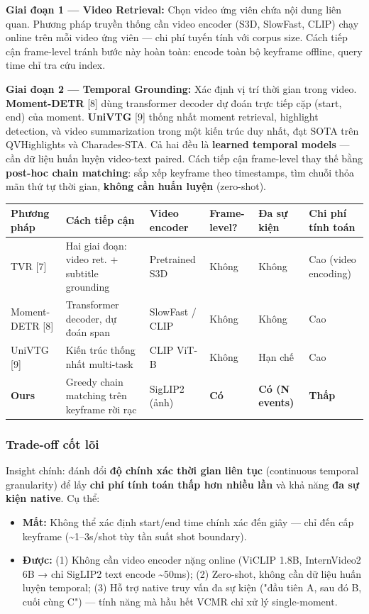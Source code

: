 \documentclass[12pt,a4paper,onecolumn]{article}
\begin{document}
\textbf{Giai đoạn 1 — Video Retrieval:} Chọn video ứng viên chứa nội dung liên quan. Phương pháp truyền thống cần video encoder (S3D, SlowFast, CLIP) chạy online trên mỗi video ứng viên — chi phí tuyến tính với corpus size. Cách tiếp cận frame-level tránh bước này hoàn toàn: encode toàn bộ keyframe offline, query time chỉ tra cứu index.

\textbf{Giai đoạn 2 — Temporal Grounding:} Xác định vị trí thời gian trong video. \textbf{Moment-DETR} [8] dùng transformer decoder dự đoán trực tiếp cặp (start, end) của moment. \textbf{UniVTG} [9] thống nhất moment retrieval, highlight detection, và video summarization trong một kiến trúc duy nhất, đạt SOTA trên QVHighlights và Charades-STA. Cả hai đều là \textbf{learned temporal models} — cần dữ liệu huấn luyện video-text paired. Cách tiếp cận frame-level thay thế bằng \textbf{post-hoc chain matching}: sắp xếp keyframe theo timestamps, tìm chuỗi thỏa mãn thứ tự thời gian, \textbf{không cần huấn luyện} (zero-shot).

\noindent
{\small
\begin{tabularx}{\textwidth}{l Y l l l l}
\toprule
Phương pháp & Cách tiếp cận & Video encoder & Frame-level? & Đa sự kiện & Chi phí tính toán \\
\midrule
TVR [7] & Hai giai đoạn: video ret. + subtitle grounding & Pretrained S3D & Không & Không & Cao (video encoding) \\
Moment-DETR [8] & Transformer decoder, dự đoán span & SlowFast / CLIP & Không & Không & Cao \\
UniVTG [9] & Kiến trúc thống nhất multi-task & CLIP ViT-B & Không & Hạn chế & Cao \\
\textbf{Ours} & Greedy chain matching trên keyframe rời rạc & SigLIP2 (ảnh) & \textbf{Có} & \textbf{Có (N events)} & \textbf{Thấp} \\
\bottomrule
\end{tabularx}
}


\subsubsection{Trade-off cốt lõi}

Insight chính: đánh đổi \textbf{độ chính xác thời gian liên tục} (continuous temporal granularity) để lấy \textbf{chi phí tính toán thấp hơn nhiều lần} và khả năng \textbf{đa sự kiện native}. Cụ thể:

\begin{itemize}
  \item \textbf{Mất:} Không thể xác định start/end time chính xác đến giây — chỉ đến cấp keyframe (\textasciitilde{}1–3s/shot tùy tần suất shot boundary).
  \item \textbf{Được:} (1) Không cần video encoder nặng online (ViCLIP 1.8B, InternVideo2 6B → chỉ SigLIP2 text encode \textasciitilde{}50ms); (2) Zero-shot, không cần dữ liệu huấn luyện temporal; (3) Hỗ trợ native truy vấn đa sự kiện ("đầu tiên A, sau đó B, cuối cùng C") — tính năng mà hầu hết VCMR chỉ xử lý single-moment.
\end{itemize}
\end{document}
